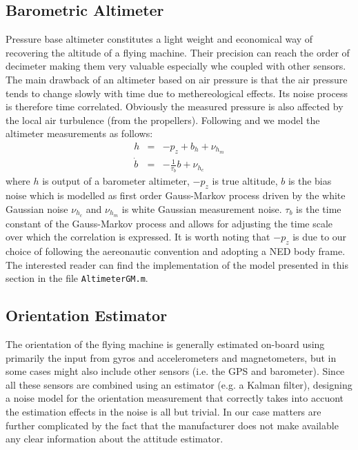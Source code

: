\documentclass[a4paper,11pt]{report}
\begin{document}
\subsection{Barometric Altimeter}

Pressure base altimeter constitutes a light weight and economical way of recovering the altitude of a flying machine. Their precision can reach the order of decimeter making them very valuable especially whe coupled with other sensors. The main drawback of an altimeter based on air pressure is that the air pressure tends to change slowly with time due to methereological effects.  Its noise process is therefore time correlated. Obviously the measured pressure is also affected by the local air turbulence (from the propellers).
Following \cite{stanley1991akalman} and \cite{seo2004position} we model the altimeter measurements as follows:
\begin{eqnarray}
      h&=&-p_z+b_h+\nu_{h_m}  \\
       \dot{b}&=&-\frac{1}{\tau_b}b+\nu_{h_c}
\end{eqnarray}
where $h$ is output of a barometer altimeter, $-p_z$ is true altitude, $b$ is the bias noise which is modelled as first order Gauss-Markov process driven by the white Gaussian noise $\nu_{h_c}$ and $\nu_{h_m}$ is white Gaussian measurement noise. $\tau_b$ is the time constant of the Gauss-Markov process and allows for adjusting the time scale over which the correlation is expressed.
It is worth noting that $-p_z$ is due to our choice of following the aereonautic convention and adopting a NED body frame.
The interested reader can find the implementation of the model presented in this section in the file \texttt{AltimeterGM.m}.  


\subsection{Orientation Estimator}

The orientation of the flying machine is generally estimated on-board using primarily the input from gyros and accelerometers and magnetometers, but in some cases might also include  other sensors (i.e. the GPS and barometer). Since all these sensors are combined using an estimator (e.g. a Kalman filter), designing a noise model for the orientation measurement that correctly takes into accuont the estimation effects in the noise is all but trivial. In our case matters are further complicated by the fact that the manufacturer does not make available any clear information about the attitude estimator.
 
\end{document}
